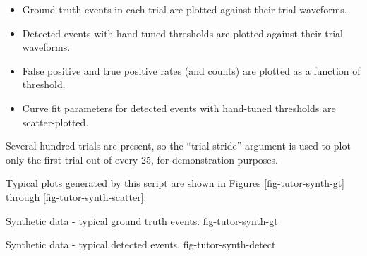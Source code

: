 \begin{itemize}
\begin{itemize}
\item Ground truth events in each trial are plotted against their trial
waveforms.
\item Detected events with hand-tuned thresholds are plotted against their
trial waveforms.
\item False positive and true positive rates (and counts) are plotted
as a function of threshold.
\item Curve fit parameters for detected events with hand-tuned thresholds
are scatter-plotted.
\end{itemize}
%
Several hundred trials are present, so the ``trial stride'' argument is used
to plot only the first trial out of every 25, for demonstration purposes.
%
\end{itemize}

Typical plots generated by this script are shown in Figures
\ref{fig-tutor-synth-gt} through \ref{fig-tutor-synth-scatter}.

{Synthetic data - typical ground truth events.}
{fig-tutor-synth-gt}

{Synthetic data - typical detected events.}
{fig-tutor-synth-detect}

